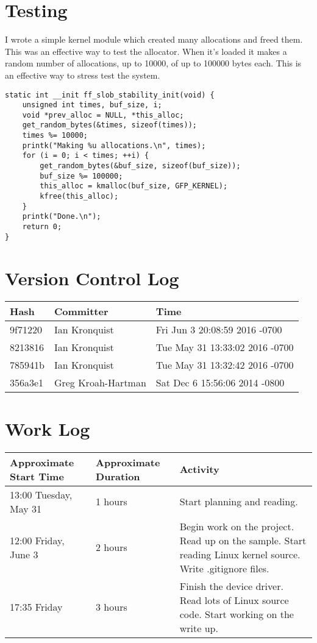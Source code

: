 \documentclass[10pt,conference,draftclsnofoot,onecolumn]{IEEEtran}
\begin{document}
\section{Testing}
I wrote a simple kernel module which created many allocations and freed them. This was an effective way to test the allocator. When it's loaded it makes a random number of allocations, up to 10000, of up to 100000 bytes each. This is an effective way to stress test the system.

\begin{lstlisting}
static int __init ff_slob_stability_init(void) {
	unsigned int times, buf_size, i;
	void *prev_alloc = NULL, *this_alloc;
	get_random_bytes(&times, sizeof(times));
	times %= 10000;
	printk("Making %u allocations.\n", times);
	for (i = 0; i < times; ++i) {
		get_random_bytes(&buf_size, sizeof(buf_size));
		buf_size %= 100000;
		this_alloc = kmalloc(buf_size, GFP_KERNEL);
		kfree(this_alloc);
	}
	printk("Done.\n");
	return 0;
}
\end{lstlisting}

\section{Version Control Log}
\begin{tabular}{|p{5cm}|p{5cm}|p{5cm}}
    \textbf{Hash} & \textbf{Committer} & \textbf{Time} \\
    \hline
9f71220 & Ian Kronquist & Fri Jun 3 20:08:59 2016 -0700 \\
8213816 & Ian Kronquist & Tue May 31 13:33:02 2016 -0700 \\
785941b & Ian Kronquist & Tue May 31 13:32:42 2016 -0700 \\
356a3e1 & Greg Kroah-Hartman & Sat Dec 6 15:56:06 2014 -0800 \\
\end{tabular}

\section{Work Log}
\begin{tabular}{|p{5cm}|p{5cm}|p{5cm}}
    \textbf{Approximate Start Time} & \textbf{Approximate Duration} & \textbf{Activity} \\
    \hline
    13:00 Tuesday, May 31 & 1 hours & Start planning and reading. \\
    12:00 Friday, June 3 & 2 hours & Begin work on the project. Read up on the sample. Start reading Linux kernel source. Write .gitignore files. \\
    17:35 Friday& 3 hours & Finish the device driver. Read lots of Linux source code. Start working on the write up. \\
\end{tabular}


\clearpage
\printbibliography

\clearpage

\begin{appendices}


\end{appendices}
\end{document}
